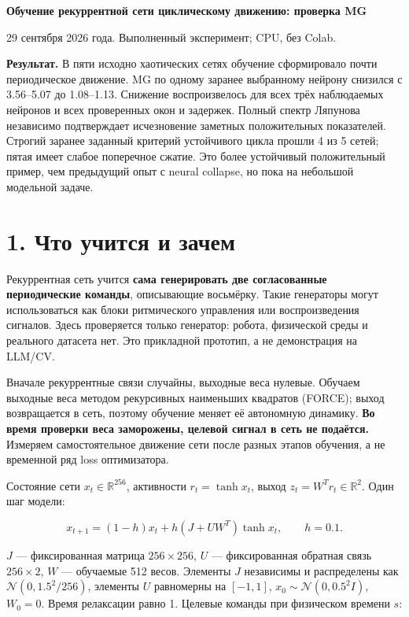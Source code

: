 \documentclass[10pt,a4paper]{article}
\begin{document}
{\Large\bfseries Обучение рекуррентной сети циклическому движению: проверка MG}\par\medskip

29 сентября 2026 года. Выполненный эксперимент; CPU, без Colab.

\textbf{Результат.} В пяти исходно хаотических сетях обучение сформировало почти периодическое движение. MG по одному заранее выбранному нейрону снизился с 3.56--5.07 до 1.08--1.13. Снижение воспроизвелось для всех трёх наблюдаемых нейронов и всех проверенных окон и задержек. Полный спектр Ляпунова независимо подтверждает исчезновение заметных положительных показателей. Строгий заранее заданный критерий устойчивого цикла прошли 4 из 5 сетей; пятая имеет слабое поперечное сжатие. Это более устойчивый положительный пример, чем предыдущий опыт с neural collapse, но пока на небольшой модельной задаче.

\section*{1. Что учится и зачем}

Рекуррентная сеть учится \textbf{сама генерировать две согласованные периодические команды}, описывающие восьмёрку. Такие генераторы могут использоваться как блоки ритмического управления или воспроизведения сигналов. Здесь проверяется только генератор: робота, физической среды и реального датасета нет. Это прикладной прототип, а не демонстрация на LLM/CV.

Вначале рекуррентные связи случайны, выходные веса нулевые. Обучаем выходные веса методом рекурсивных наименьших квадратов (FORCE); выход возвращается в сеть, поэтому обучение меняет её автономную динамику. \textbf{Во время проверки веса заморожены, целевой сигнал в сеть не подаётся.} Измеряем самостоятельное движение сети после разных этапов обучения, а не временной ряд loss оптимизатора.

Состояние сети $x_t\in\mathbb R^{256}$, активности $r_t=\tanh x_t$, выход $z_t=W^Tr_t\in\mathbb R^2$. Один шаг модели:

\[
x_{t+1}=(1-h)x_t+h(J+UW^T)\tanh x_t,\qquad h=0.1.
\]

$J$ --- фиксированная матрица $256\times256$, $U$ --- фиксированная обратная связь $256\times2$, $W$ --- обучаемые 512 весов. Элементы $J$ независимы и распределены как $\mathcal N(0,1.5^2/256)$, элементы $U$ равномерны на $[-1,1]$, $x_0\sim\mathcal N(0,0.5^2I)$, $W_0=0$. Время релаксации равно 1. Целевые команды при физическом времени $s$:
\end{document}
